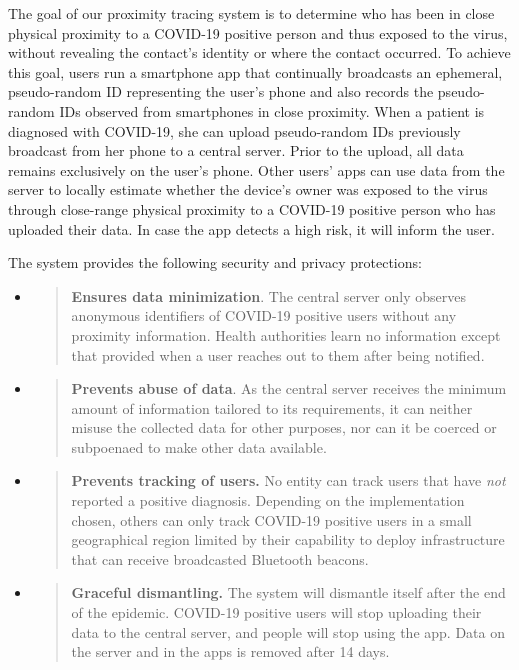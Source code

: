 \documentclass{article}
\begin{document}
The goal of our proximity tracing system is to determine who has been in
close physical proximity to a COVID-19 positive person and thus exposed
to the virus, without revealing the contact's identity or where the
contact occurred. To achieve this goal, users run a smartphone app that
continually broadcasts an ephemeral, pseudo-random ID representing the
user's phone and also records the pseudo-random IDs observed from
smartphones in close proximity. When a patient is diagnosed with
COVID-19, she can upload pseudo-random IDs previously broadcast from her
phone to a central server. Prior to the upload, all data remains
exclusively on the user's phone. Other users' apps can use data from the
server to locally estimate whether the device's owner was exposed to the
virus through close-range physical proximity to a COVID-19 positive
person who has uploaded their data. In case the app detects a high risk,
it will inform the user.

The system provides the following security and privacy protections:

\begin{itemize}
\item
  \begin{quote}
  \textbf{Ensures data minimization}. The central server only observes
  anonymous identifiers of COVID-19 positive users without any proximity
  information. Health authorities learn no information except that
  provided when a user reaches out to them after being notified.
  \end{quote}
\end{itemize}

\begin{itemize}
\item
  \begin{quote}
  \textbf{Prevents abuse of data}. As the central server receives the
  minimum amount of information tailored to its requirements, it can
  neither misuse the collected data for other purposes, nor can it be
  coerced or subpoenaed to make other data available.
  \end{quote}
\item
  \begin{quote}
  \textbf{Prevents tracking of users.} No entity can track users that
  have \emph{not} reported a positive diagnosis. Depending on the
  implementation chosen, others can only track COVID-19 positive users
  in a small geographical region limited by their capability to deploy
  infrastructure that can receive broadcasted Bluetooth beacons.
  \end{quote}
\item
  \begin{quote}
  \textbf{Graceful dismantling.} The system will dismantle itself after
  the end of the epidemic. COVID-19 positive users will stop uploading
  their data to the central server, and people will stop using the app.
  Data on the server and in the apps is removed after 14 days.
  \end{quote}
\end{itemize}
\end{document}
